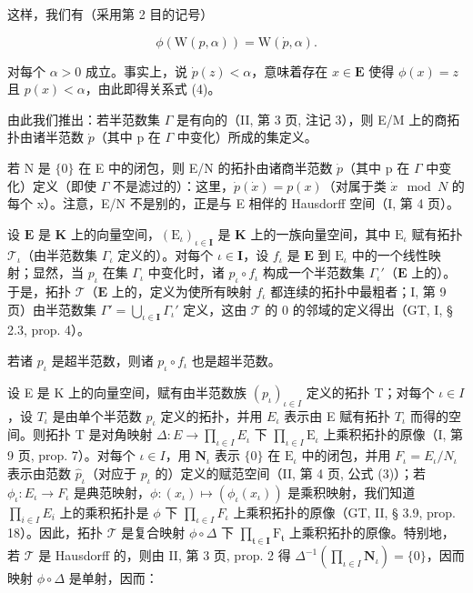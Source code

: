这样，我们有（采用第 2 目的记号）

\[
\phi (\mathrm{W} (p, \alpha)) = \mathrm{W} (\dot {p}, \alpha).\tag{4}
\]

对每个 \(\alpha > 0\) 成立。事实上，说 \(\dot{p}(z) < \alpha\)，意味着存在 \(x \in \mathbf{E}\) 使得 \(\phi(x) = z\) 且 \(p(x) < \alpha\)，由此即得关系式 (4)。

由此我们推出：若半范数集 \(\Gamma\) 是有向的（II, 第 3 页, 注记 3），则 E/M 上的商拓扑由诸半范数 \(\dot{p}\)（其中 p 在 \(\Gamma\) 中变化）所成的集定义。

若 N 是 \(\{0\}\) 在 E 中的闭包，则 E/N 的拓扑由诸商半范数 \(\dot{p}\)（其中 p 在 \(\Gamma\) 中变化）定义（即使 \(\Gamma\) 不是滤过的）：这里，\(\dot{p}(\dot{x}) = p(x)\)（对属于类 \(\dot{x} \mod N\) 的每个 x）。注意，E/N 不是别的，正是与 E 相伴的 Hausdorff 空间（I, 第 4 页）。

设 \(\mathbf{E}\) 是 \(\mathbf{K}\) 上的向量空间，\((\mathrm{E}_{\iota})_{\iota \in \mathbf{I}}\) 是 \(\mathbf{K}\) 上的一族向量空间，其中 \(\mathrm{E}_{\iota}\) 赋有拓扑 \(\mathcal{T}_{\iota}\)（由半范数集 \(\Gamma_{\iota}\) 定义的）。对每个 \(\iota \in \mathbf{I}\)，设 \(f_{\iota}\) 是 \(\mathbf{E}\) 到 \(\mathrm{E}_{\iota}\) 中的一个线性映射；显然，当 \(p_{\iota}\) 在集 \(\Gamma_{\iota}\) 中变化时，诸 \(p_{\iota} \circ f_{\iota}\) 构成一个半范数集 \(\Gamma_{\iota}'\)（\(\mathbf{E}\) 上的）。于是，拓扑 \(\mathcal{T}\)（\(\mathbf{E}\) 上的，定义为使所有映射 \(f_{\iota}\) 都连续的拓扑中最粗者；I, 第 9 页）由半范数集 \(\Gamma' = \bigcup_{\iota \in \mathbf{I}} \Gamma_{\iota}'\) 定义，这由 \(\mathcal{T}\) 的 0 的邻域的定义得出（GT, I, § 2.3, prop. 4）。

若诸 \(p_{\iota}\) 是超半范数，则诸 \(p_{\iota} \circ f_{\iota}\) 也是超半范数。

设 E 是 K 上的向量空间，赋有由半范数族 \((p_{\iota})_{\iota \in I}\) 定义的拓扑 T；对每个 \(\iota \in I\)，设 \(T_{\iota}\) 是由单个半范数 \(p_{\iota}\) 定义的拓扑，并用 \(E_{\iota}\) 表示由 E 赋有拓扑 \(T_{\iota}\) 而得的空间。则拓扑 T 是对角映射 \(\Delta : E \to \prod_{\iota \in I} E_{\iota}\) 下 \(\prod_{\iota \in I} \mathrm{E}_{\iota}\) 上乘积拓扑的原像（I, 第 9 页, prop. 7）。对每个 \(\iota \in I\)，用 \(\mathbf {N} _ {\iota}\) 表示 \(\{0 \}\) 在 \(\mathrm{E} _ {\iota}\) 中的闭包，并用 \(F_{\iota} = E_{\iota}/N_{\iota}\) 表示由范数 \(\hat{p}_{\iota}\)（对应于 \(p_{\iota}\) 的）定义的赋范空间（II, 第 4 页, 公式 (3)）；若 \(\phi_{\iota}: E_{\iota} \to F_{\iota}\) 是典范映射，\(\phi : (x_{\iota}) \mapsto (\phi_{\iota}(x_{\iota}))\) 是乘积映射，我们知道 \(\prod_{i \in I} E_{i}\) 上的乘积拓扑是 \(\phi\) 下 \(\prod_{\iota \in I}F_{\iota}\) 上乘积拓扑的原像（GT, II, § 3.9, prop. 18）。因此，拓扑 \(\mathcal{T}\) 是复合映射 \(\phi \circ \Delta\) 下 \(\prod_{\mathfrak{t}\in \mathbf{I}}\mathrm{F}_{\mathfrak{t}}\) 上乘积拓扑的原像。特别地，若 \(\mathcal{T}\) 是 Hausdorff 的，则由 II, 第 3 页, prop. 2 得 \(\Delta^{-1}(\prod_{\iota \in I} \mathbf{N}_{\iota}) = \{0 \}\)，因而映射 \(\phi \circ \Delta\) 是单射，因而：

